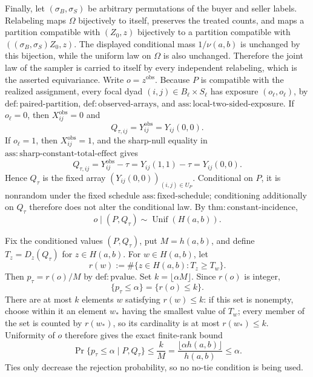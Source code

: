 Finally, let \((\sigma_B,\sigma_S)\) be arbitrary permutations of the buyer and seller labels.  Relabeling maps \(\Omega\) bijectively to itself, preserves the treated counts, and maps a partition compatible with \((Z_0,z)\) bijectively to a partition compatible with \(((\sigma_B,\sigma_S)Z_0,z)\).  The displayed conditional mass \(1/\nu(a,b)\) is unchanged by this bijection, while the uniform law on \(\Omega\) is also unchanged.  Therefore the joint law of the sampler is carried to itself by every independent relabeling, which is the asserted equivariance.
Write \(o=z^{\mathrm{obs}}\).  Because \(P\) is compatible with the realized assignment, every focal dyad \((i,j)\in B_\ell\times S_\ell\) has exposure \((o_\ell,o_\ell)\), by \(\mathrm{def{:}paired\mbox{-}partition}\), \(\mathrm{def{:}observed\mbox{-}arrays}\), and \(\mathrm{ass{:}local\mbox{-}two\mbox{-}sided\mbox{-}exposure}\).  If \(o_\ell=0\), then \(X_{ij}^{\mathrm{obs}}=0\) and
\[
 Q_{\tau,ij}=Y_{ij}^{\mathrm{obs}}=Y_{ij}(0,0).
\]
If \(o_\ell=1\), then \(X_{ij}^{\mathrm{obs}}=1\), and the sharp-null equality in \(\mathrm{ass{:}sharp\mbox{-}constant\mbox{-}total\mbox{-}effect}\) gives
\[
 Q_{\tau,ij}=Y_{ij}^{\mathrm{obs}}-\tau
 =Y_{ij}(1,1)-\tau
 =Y_{ij}(0,0).
\]
Hence \(Q_\tau\) is the fixed array \((Y_{ij}(0,0))_{(i,j)\in U_P}\).  Conditional on \(P\), it is nonrandom under the fixed schedule \(\mathrm{ass{:}fixed\mbox{-}schedule}\); conditioning additionally on \(Q_\tau\) therefore does not alter the conditional law.  By \(\mathrm{thm{:}constant\mbox{-}incidence}\),
\[
 o\mid(P,Q_\tau)\sim\operatorname{Unif}(H(a,b)).
\]

Fix the conditioned values \((P,Q_\tau)\), put \(M=h(a,b)\), and define \(T_z=D_z(Q_\tau)\) for \(z\in H(a,b)\).  For \(w\in H(a,b)\), let
\[
 r(w):=\#\{z\in H(a,b):T_z\ge T_w\}.
\]
Then \(p_\tau=r(o)/M\) by \(\mathrm{def{:}pvalue}\).  Set \(k=\lfloor\alpha M\rfloor\).  Since \(r(o)\) is integer,
\[
 \{p_\tau\le\alpha\}=\{r(o)\le k\}.
\]
There are at most \(k\) elements \(w\) satisfying \(r(w)\le k\): if this set is nonempty, choose within it an element \(w_*\) having the smallest value of \(T_w\); every member of the set is counted by \(r(w_*)\), so its cardinality is at most \(r(w_*)\le k\).  Uniformity of \(o\) therefore gives the exact finite-rank bound
\[
 \Pr\{p_\tau\le\alpha\mid P,Q_\tau\}
 \le \frac{k}{M}
 =\frac{\lfloor\alpha h(a,b)\rfloor}{h(a,b)}
 \le\alpha.
\]
Ties only decrease the rejection probability, so no no-tie condition is being used.

